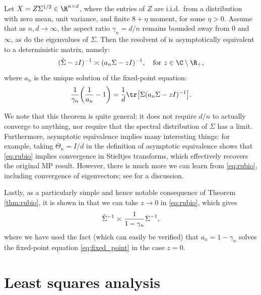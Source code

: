 \documentclass{article}
\begin{document}
\begin{theorem}
\label{thm:rubio}
Let $X = Z \Sigma^{1/2} \in \R^{n \times d}$, where the entries of $Z$ are
i.i.d.\ from a distribution with zero mean, unit variance, and finite $8+\eta$ 
moment, for some $\eta>0$. Assume that as $n,d \to \infty$, the aspect ratio 
$\gamma_n = d/n$ remains bounded away from $0$ and $\infty$, as do the
eigenvalues of $\Sigma$. Then the resolvent of  is
asymptotically equivalent to a deterministic matrix, namely:
\begin{equation}
\label{eq:rubio}
(\hSigma - zI)^{-1} \asymp (a_n \Sigma - zI)^{-1}, \quad \text{for $z \in \C  
  \setminus \R_+$},
\end{equation}
where $a_n$ is the unique solution of the fixed-point equation:
\begin{equation}
\label{eq:fixed_point}
\frac{1}{\gamma_n} \bigg( \frac{1}{a_n} - 1 \bigg) = \frac{1}{d} \tr \big[
\Sigma (a_n \Sigma - zI)^{-1} \big]. 
\end{equation}
\end{theorem}

We note that this theorem is quite general: it does not require $d/n$ to
actually converge to anything, nor require that the spectral distribution of
$\Sigma$ has a limit. Furthermore, asymptotic equivalence implies many
interesting things: for example, taking $\Theta_n = I/d$ in the definition
of asymptotic equivalence shows that \eqref{eq:rubio} implies convergence in 
Stieltjes transforms, which effectively recovers the original MP
result. However, there is much more we can learn from \eqref{eq:rubio},
including convergence of eigenvectors; see \citet{rubio2011spectral} for a
discussion.     

Lastly, as a particularly simple and hence notable consequence of Theorem
\ref{thm:rubio}, it is shown in \citet{dobriban2021distributed} that we can take
$z \to 0$ in \eqref{eq:rubio}, which gives
\begin{equation}
\label{eq:cov_deter_equiv}
\hat\Sigma^{-1} \asymp \frac{1}{1 - \gamma_n} \Sigma^{-1},
\end{equation}
where we have used the fact (which can easily be verified) that $a_n =
1-\gamma_n$ solves the fixed-point equation \eqref{eq:fixed_point} in the case 
$z=0$. 

\section{Least squares analysis}
\end{document}

